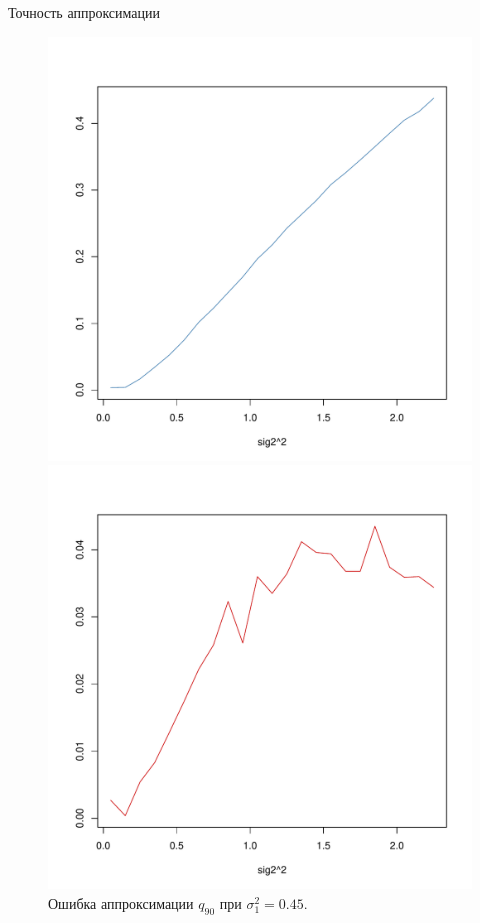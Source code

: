 \documentclass[ucs, notheorems, handout]{beamer}
\begin{document}
\begin{frame}{Точность аппроксимации }
	
	\begin{figure}[h]
		\begin{center}
			\begin{minipage}[h]{0.47\linewidth}
				\includegraphics[width=1\linewidth]{gr_new_2.pdf}
				\caption{Ошибка аппроксимации $q_{10}$ при $\sigma_{1}^{2} = 0.45$.} %
				\label{ris7} %
			\end{minipage}
			\hfill
			\begin{minipage}[h]{0.47\linewidth}
				\includegraphics[width=1\linewidth]{gr_new_3.pdf}
				\caption{Ошибка аппроксимации $q_{90}$ при $\sigma_{1}^{2} = 0.45$.}
				\label{ris8}
			\end{minipage}


\end{center}
\end{figure}
\end{frame}
\end{document}

